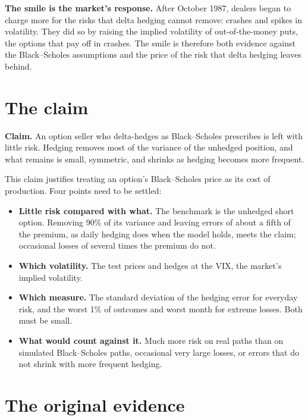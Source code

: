 \textbf{The smile is the market's response.} After October 1987, dealers began to charge more for the risks that delta hedging cannot remove: crashes and spikes in volatility. They did so by raising the implied volatility of out-of-the-money puts, the options that pay off in crashes. The smile is therefore both evidence against the Black--Scholes assumptions and the price of the risk that delta hedging leaves behind.


\section{The claim}
\label{sec:14-claim}

\begin{callout}
\textbf{Claim.} An option seller who delta-hedges as Black--Scholes prescribes is left with little risk. Hedging removes most of the variance of the unhedged position, and what remains is small, symmetric, and shrinks as hedging becomes more frequent.
\end{callout}

This claim justifies treating an option's Black--Scholes price as its cost of production. Four points need to be settled:

\begin{itemize}
  \item \textbf{Little risk compared with what.} The benchmark is the unhedged short option. Removing 90\% of its variance and leaving errors of about a fifth of the premium, as daily hedging does when the model holds, meets the claim; occasional losses of several times the premium do not.
  \item \textbf{Which volatility.} The test prices and hedges at the VIX, the market's implied volatility.
  \item \textbf{Which measure.} The standard deviation of the hedging error for everyday risk, and the worst 1\% of outcomes and worst month for extreme losses. Both must be small.
  \item \textbf{What would count against it.} Much more risk on real paths than on simulated Black--Scholes paths, occasional very large losses, or errors that do not shrink with more frequent hedging.
\end{itemize}

\section{The original evidence}
\label{sec:14-evidence}

